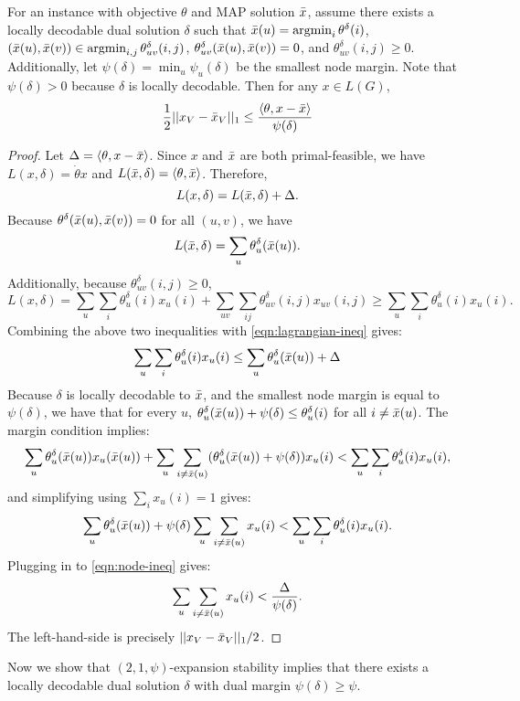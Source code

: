 \begin{lemma}
For an instance with objective $\theta$ and MAP solution $\bar{x}$, assume there exists a locally decodable dual solution $\delta$ such that $\bar{x}(u) = \operatorname*{\text{argmin}}_i\theta^{\delta}(i)$, $(\bar{x}(u), \bar{x}(v)) \in \operatorname*{\text{argmin}}_{i,j}\theta^{\delta}_{uv}(i,j)$, $\theta^{\delta}_{uv}(\bar{x}(u),\bar{x}(v)) = 0$, and $\theta^{\delta}_{uv}(i,j) \ge 0$. Additionally, let $\psi(\delta) = \min_u\psi_u(\delta)$ be the smallest node margin. Note that $\psi(\delta) > 0$ because $\delta$ is locally decodable.
Then for any $x\in L(G)$,
\[
\frac{1}{2}||x_V-\bar{x}_V||_1 \le \frac{\langle \theta,x-\bar{x}\rangle}{\psi(\delta)}
\]
\end{lemma}
\begin{proof}
  Let $\Delta = \langle \theta,x - \bar{x}\rangle$. 
  Since $x$ and $\bar{x}$ are both primal-feasible, we have $L(x,\delta) = \dot{\theta}{x}$ and $L(\bar{x}, \delta) = \langle \theta,\bar{x}\rangle$. Therefore,
  \begin{equation}\label{eqn:lagrangian-ineq}
  L(x,\delta) = L(\bar{x},\delta) + \Delta.
  \end{equation}
  Because $\theta^{\delta}(\bar{x}(u),\bar{x}(v)) = 0$ for all $(u,v)$, we have
  \[
  L(\bar{x},\delta) = \sum_u \theta_u^{\delta}(\bar{x}(u)).
  \]
  Additionally, because $\theta^{\delta}_{uv}(i,j) \ge 0$,
  \[
  L(x,\delta) = \sum_u\sum_i\theta_u^{\delta}(i)x_u(i) + \sum_{uv}\sum_{ij}\theta^{\delta}_{uv}(i,j)x_{uv}(i,j) \ge \sum_u\sum_i\theta_u^{\delta}(i)x_u(i).
  \]
  Combining the above two inequalities with \eqref{eqn:lagrangian-ineq} gives:
  \begin{equation}\label{eqn:node-ineq}
  \sum_u\sum_i\theta_u^{\delta}(i)x_u(i)  \le \sum_u \theta_u^{\delta}(\bar{x}(u)) + \Delta
  \end{equation}
  Because $\delta$ is locally decodable to $\bar{x}$, and the smallest node margin is equal to $\psi(\delta)$, we have that for every $u$,
  $\theta^{\delta}_u(\bar{x}(u)) + \psi(\delta) \le \theta^{\delta}_u(i)$ for all $i\ne \bar{x}(u)$.
  The margin condition implies:
  \[
  \sum_u\theta^{\delta}_u(\bar{x}(u))x_u(\bar{x}(u)) + \sum_u\sum_{i\ne \bar{x}(u)}(\theta^{\delta}_u(\bar{x}(u)) + \psi(\delta))x_u(i) < \sum_u\sum_i\theta_u^{\delta}(i)x_u(i),
  \]
  and simplifying using $\sum_ix_u(i) = 1$ gives:
  \[
  \sum_u\theta^{\delta}_u(\bar{x}(u)) + \psi(\delta)\sum_u\sum_{i\ne \bar{x}(u)}x_u(i) < \sum_u\sum_i\theta_u^{\delta}(i)x_u(i).
  \]
  Plugging in to \eqref{eqn:node-ineq} gives:
  \[
  \sum_u\sum_{i\ne \bar{x}(u)}x_u(i) < \frac{\Delta}{\psi(\delta)}.
  \]
  The left-hand-side is precisely $||x_V-\bar{x}_V||_1 / 2$.
\end{proof}
Now we show that $(2,1,\psi)$-expansion stability implies that there exists a locally decodable dual solution $\delta$ with dual margin $\psi(\delta) \ge \psi$.

